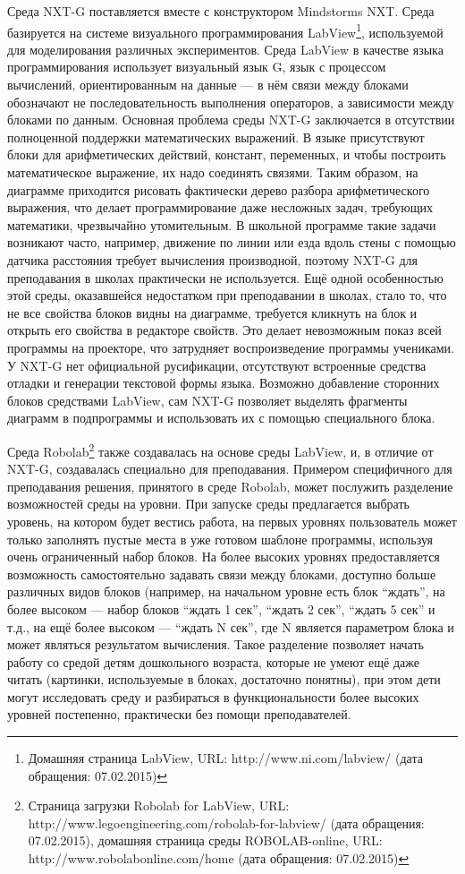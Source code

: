 Среда NXT-G поставляется вместе с конструктором Mindstorms NXT. Среда базируется на системе визуального программирования 
LabView\footnote{Домашняя страница LabView, URL: http://www.ni.com/labview/ (дата обращения: 07.02.2015)}, 
используемой для моделирования различных экспериментов. Среда LabView в качестве 
языка программирования использует визуальный язык G, язык с процессом вычислений, 
ориентированным на данные --- в нём связи между блоками обозначают не последовательность 
выполнения операторов, а зависимости между блоками по данным. Основная проблема среды NXT-G 
заключается в отсутствии полноценной поддержки математических выражений. В языке присутствуют 
блоки для арифметических действий, констант, переменных, и чтобы построить математическое
выражение, их надо соединять связями. Таким образом, на диаграмме приходится рисовать 
фактически дерево разбора арифметического выражения, что делает программирование даже 
несложных задач, требующих математики, чрезвычайно утомительным. В школьной программе 
такие задачи возникают часто, например, движение по линии или езда вдоль стены с помощью 
датчика расстояния требует вычисления производной, поэтому NXT-G для преподавания в 
школах практически не используется. Ещё одной особенностью этой среды, оказавшейся 
недостатком при преподавании в школах, стало то, что не все свойства блоков видны 
на диаграмме, требуется кликнуть на блок и открыть его свойства в редакторе свойств. 
Это делает невозможным показ всей программы на проекторе, что затрудняет воспроизведение 
программы учениками. У NXT-G нет официальной русификации, отсутствуют встроенные 
средства отладки и генерации текстовой формы языка. Возможно добавление сторонних 
блоков средствами LabView, сам NXT-G позволяет выделять фрагменты диаграмм в подпрограммы 
и использовать их с помощью специального блока.

Среда Robolab\footnote{Страница загрузки Robolab for LabView, URL: http://www.legoengineering.com/robolab-for-labview/ (дата обращения: 07.02.2015), 
домашняя страница среды ROBOLAB-online, URL: http://www.robolabonline.com/home (дата обращения: 07.02.2015)}
также создавалась на основе среды LabView, и, в отличие от NXT-G, создавалась 
специально для преподавания. Примером специфичного для преподавания решения, принятого 
в среде Robolab, может послужить разделение возможностей среды на уровни. При запуске 
среды предлагается выбрать уровень, на котором будет вестись работа, на первых уровнях 
пользователь может только заполнять пустые места в уже готовом шаблоне программы, 
используя очень ограниченный набор блоков. На более высоких уровнях предоставляется 
возможность самостоятельно задавать связи между блоками, доступно больше различных 
видов блоков (например, на начальном уровне есть блок "`ждать"', на более высоком --- 
набор блоков "`ждать 1 сек"', "`ждать 2 сек"', "`ждать 5 сек"' и т.д., на ещё более 
высоком --- "`ждать N сек"', где N является параметром блока и может являться результатом 
вычисления. Такое разделение позволяет начать работу со средой детям дошкольного возраста, 
которые не умеют ещё даже читать (картинки, используемые в блоках, достаточно понятны), 
при этом дети могут исследовать среду и разбираться в функциональности более высоких 
уровней постепенно, практически без помощи преподавателей.

